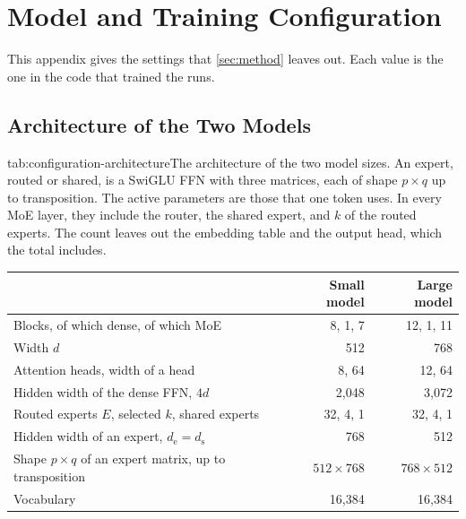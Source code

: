 \chapter{Model and Training Configuration}
\label{app:configuration}

This appendix gives the settings that \cref{sec:method} leaves out. Each value is the one in the code that trained the runs.

\section{Architecture of the Two Models}
\label{app:configuration-architecture}

\begin{table}[The architecture of the two model sizes]{tab:configuration-architecture}{The architecture of the two model sizes. An expert, routed or shared, is a SwiGLU FFN with three matrices, each of shape $p \times q$ up to transposition. The active parameters are those that one token uses. In every MoE layer, they include the router, the shared expert, and $k$ of the routed experts. The count leaves out the embedding table and the output head, which the total includes.}
  \begin{tabular}{lrr}
    \toprule
                                                                 & Small model      & Large model      \\
    \midrule
    Blocks, of which dense, of which MoE                         & 8, 1, 7          & 12, 1, 11        \\
    Width $d$                                                    & 512              & 768              \\
    Attention heads, width of a head                             & 8, 64            & 12, 64           \\
    Hidden width of the dense FFN, $4d$                          & 2,048            & 3,072            \\
    Routed experts $E$, selected $k$, shared experts             & 32, 4, 1         & 32, 4, 1         \\
    Hidden width of an expert, $d_{\mathrm{e}} = d_{\mathrm{s}}$ & 768              & 512              \\
    Shape $p \times q$ of an expert matrix, up to transposition  & $512 \times 768$ & $768 \times 512$ \\
    Vocabulary                                                   & 16,384           & 16,384           \\

\end{tabular}
\end{table}
